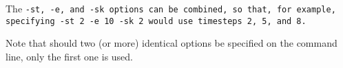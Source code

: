 


The \tt{-st}, \tt{-e}, and \tt{-sk} options can be combined, so that, for
example, specifying \tt{-st 2 -e 10 -sk 2} would use timesteps 2, 5, and 8.

Note that should two (or more) identical options be specified on the command
line, only the first one is used.






% 
% 

% 
% 

% 
% 
% 
% 

% 

% 
% 
% 
% 
% 
% 


% 
% 
% 
